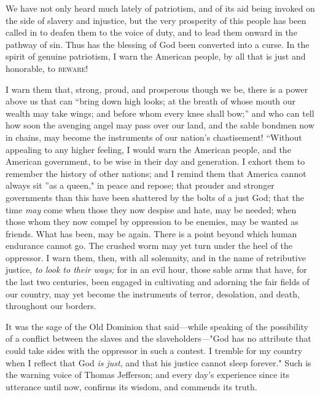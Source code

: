 We have not only heard much lately of patriotism, and of its aid {}being
invoked on the side of slavery and injustice, but the very prosperity of
this people has been called in to deafen them to the voice of duty, and
to lead them onward in the pathway of sin. Thus has the blessing of God
been converted into a curse. In the spirit of genuine patriotism, I warn
the American people, by all that is just and honorable, to
\textsc{beware}!

I warn them that, strong, proud, and prosperous though we be, there is a
power above us that can ``bring down high looks; at the breath of whose
mouth our wealth may take wings; and before whom every knee shall bow;''
and who can tell how soon the avenging angel may pass over our land, and
the sable bondmen now in chains, may become the instruments of our
nation's chastisement! ``Without appealing to any higher feeling, I
would warn the American people, and the American government, to be wise
in their day and generation. I exhort them to remember the history of
other nations; and I remind them that America cannot always sit ''as a
queen," in peace and repose; that prouder and stronger governments than
this have been shattered by the bolts of a just God; that the time
\emph{may} come when those they now despise and hate, may be needed;
when those whom they now compel by oppression to be enemies, may be
wanted as friends. What has been, may be again. There is a point beyond
which human endurance cannot go. The crushed worm may yet turn under the
heel of the oppressor. I warn them, then, with all solemnity, and in the
name of retributive justice, \emph{to look to their ways;} for in an
evil hour, those sable arms that have, for the last two centuries, been
engaged in cultivating and adorning the fair fields of our country, may
yet become the instruments of terror, desolation, and death, throughout
our borders.

It was the sage of the Old Dominion that said---while speaking of the
possibility of a conflict between the slaves and the slaveholders---"God
has no attribute that could take sides with the oppressor in such a
contest. I tremble for my country when I reflect that God \emph{is
just}, and that his justice cannot sleep forever." Such is the warning
voice of Thomas Jefferson; and every day's experience since its
utterance until now, confirms its wisdom, and commends its truth.

{\protect\hypertarget{ux5cux7bux5cux7bux5cux7b1ux5cux7dux5cux7dux5cux7d}{}{}}

{}

